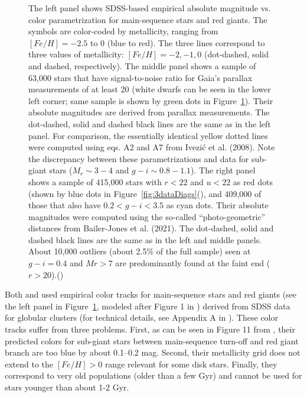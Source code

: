 \begin{figure}[b!]
\caption{The left panel shows SDSS-based empirical absolute magnitude vs. color parametrization for main-sequence stars and red giants.
The symbols  are color-coded by metallicity, ranging from $[Fe/H] = -2.5$ to 0 (blue to red). The three lines correspond to three values of
metallicity: $[Fe/H] = -2, -1, 0$ (dot-dashed, solid and dashed, respectively). The middle panel shows a sample of 63,000 stars that have
signal-to-noise ratio for Gaia’s parallax measurements of at least 20 (white dwarfs can be seen in the lower left corner; same sample is
shown by green dots in Figure~\ref{fig:3HRdiags}). Their absolute magnitudes are derived from parallax measurements. The dot-dashed,
solid and dashed black lines are the same as in the left panel. For comparison, the essentially identical yellow dotted lines were computed
using eqs. A2 and A7 from Ivezi\'{c} et al. (2008).  Note the discrepancy between these parametrizations and data for sub-giant stars ($M_r \sim 3-4$
and $g-i \sim 0.8-1.1$). The right panel shows a sample of 415,000 stars with $r < 22$ and $u<22$ as red dots (shown by blue dots in Figure~\ref{fig:3dataDiags}(), and 409,000 of those that also have  $0.2 < g-i < 3.5$ as cyan dots. Their absolute magnitudes were computed
using the so-called “photo-geometric” distances from Bailer-Jones et al. (2021). The dot-dashed, solid and dashed black lines are the
same as in the left and middle panels. About 10,000 outliers (about 2.5\% of the full
sample) seen at $g-i = 0.4$ and $Mr > 7$ are predominantly found at the faint end ($r>20$).()}
\label{fig:3HRdiags}
\end{figure}


Both \cite{2012ApJ...757..166B} and \cite{2014ApJ...783..114G} used empirical color tracks for main-sequence stars
and red giants (see the left panel in Figure~\ref{fig:3HRdiags}, modeled after Figure 1 in \citealt{2014ApJ...783..114G})
derived from SDSS data for globular clusters (for technical details, see
Appendix A in \citealt{2008ApJ...684..287I}). These color tracks suffer from three problems. First, as can be seen in Figure 11 from
\cite{2014ApJ...783..114G}, their predicted colors for sub-giant stars between main-sequence turn-off and red giant branch are too blue by
about 0.1--0.2 mag. Second, their metallicity grid does not extend to the $[Fe/H]>0$ range relevant for some disk stars. Finally, they
correspond to very old populations (older than a few Gyr) and cannot be used for stars younger than about 1-2 Gyr. 

